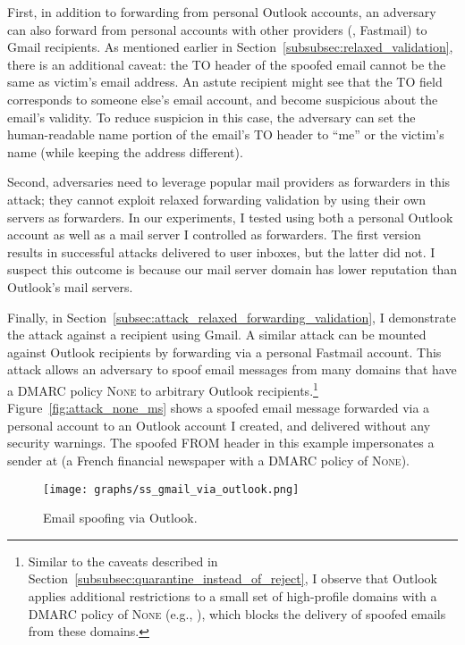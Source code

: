 First, in addition to forwarding from personal Outlook accounts, an
adversary can also forward from personal accounts with other providers
(\eg, Fastmail) to Gmail recipients.
As mentioned earlier in Section~\ref{subsubsec:relaxed_validation}, there is an additional caveat: the \textsc{TO} header of the spoofed email cannot be the same as victim's email address.
An astute recipient might see that the \textsc{TO} field corresponds to someone else's email account, and become suspicious about the email's validity.
To reduce suspicion in this case, the adversary can set the
human-readable name portion of the email's \textsc{TO} header to
``me'' or the victim's name (while keeping the address different).

Second, adversaries need to leverage popular mail providers as forwarders in this attack; they cannot exploit relaxed forwarding validation by using their own servers as forwarders.
In our experiments, I tested using both a personal Outlook account as well as a mail server I controlled as forwarders.
The first version results in successful attacks delivered to user inboxes, but the latter did not.
I suspect this outcome is because our mail server domain has lower reputation than Outlook's mail servers.

Finally, in Section~\ref{subsec:attack_relaxed_forwarding_validation}, I demonstrate the attack against a recipient using Gmail. A similar attack can be mounted against Outlook recipients by
forwarding via a personal Fastmail account. This attack allows an
adversary to spoof email messages from many domains that have a DMARC
policy \textsc{None} to arbitrary Outlook recipients.\footnote{Similar to the caveats described in
Section~\ref{subsubsec:quarantine_instead_of_reject}, I observe that Outlook applies
additional restrictions to a small set of high-profile domains with a
DMARC policy of \textsc{None} (e.g., ), which blocks the delivery of spoofed emails from these domains.}
Figure~\ref{fig:attack_none_ms} shows a spoofed email message
forwarded via a personal account to an Outlook account I created, and
delivered without any security warnings. The spoofed FROM header in
this example impersonates a sender at  (a French
financial newspaper with a DMARC policy of \textsc{None}).

\begin{figure}[t]
  \centerline{\texttt{[image: graphs/ss\_gmail\_via\_outlook.png]}}
  \centering
  \caption{Email spoofing  via Outlook.}
  \label{fig:ss_gmail_via_outlook}
  \end{figure}


